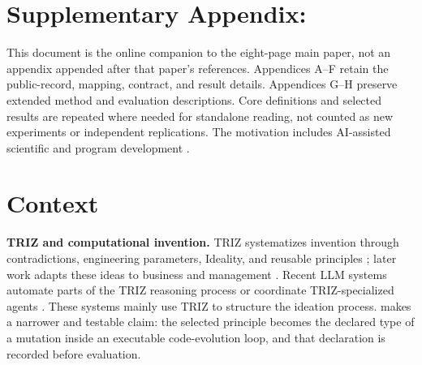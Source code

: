 \documentclass[manuscript,screen,nonacm]{acmart}
\begin{document}



\let\trizaOriginalNoLinkUrl\nolinkurl
\renewcommand{\nolinkurl}[1]{%
  \trizaOriginalNoLinkUrl{#1}%
  \ifstrequal{#1}{liuwy@gdut.edu.cn}{\textsuperscript{*}}{}}
\maketitle
\let\nolinkurl\trizaOriginalNoLinkUrl


\clearpage
\appendix
{}

\section*{Supplementary Appendix: \papertitle}
This document is the online companion to the eight-page main paper,
not an appendix appended after that paper's references. Appendices A--F
retain the public-record, mapping, contract, and result details.
Appendices G--H preserve extended method and evaluation descriptions.
Core definitions and selected results are repeated where needed for
standalone reading, not counted as new experiments or independent
replications. The motivation includes AI-assisted scientific and program
development \citep{jumper2021,romeraparedes2024,novikov2025}.

\section*{Context}


\textbf{TRIZ and computational invention.} TRIZ systematizes invention through contradictions, engineering parameters, Ideality, and reusable principles \citep{altshuller1984}; later work adapts these ideas to business and management \citep{mann2004}. Recent LLM systems automate parts of the TRIZ reasoning process or coordinate TRIZ-specialized agents \citep{jiang2025,szczepanik2025}. These systems mainly use TRIZ to structure the ideation process. \triza{} makes a narrower and testable claim: the selected principle becomes the declared type of a mutation inside an executable code-evolution loop, and that declaration is recorded before evaluation.
\end{document}
